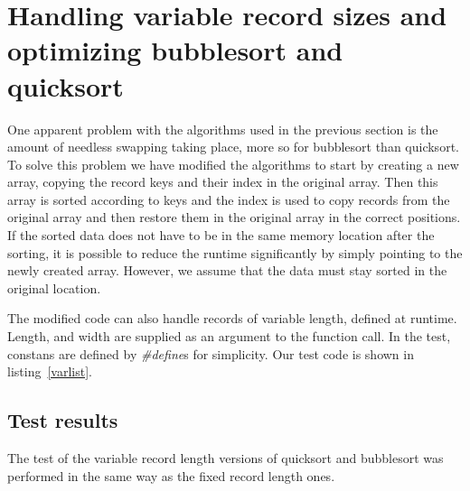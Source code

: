 \section{Handling variable record sizes and optimizing bubblesort and quicksort}
One apparent problem with the algorithms used in the previous section is the amount of needless swapping taking place, more so
for bubblesort than quicksort. To solve this problem we have modified the algorithms to start by creating a new array, copying 
the record keys and their index in the original array. Then this array is sorted according to keys and the index is used to copy 
records from the original array and then restore them in the original array in the correct positions. If the sorted data does not have
to be in the same memory location after the sorting, it is possible to reduce the runtime significantly by simply pointing to the newly
created array. However, we assume that the data must stay sorted in the original location.

The modified code can also handle records of variable length, defined at
runtime. Length, and width are supplied as an argument to the function call. In the test, constans are defined
by \emph{\#define}s for
simplicity.
Our test code is shown in listing~\ref{varlist}. 
\subsection{Test results}
The test of the variable record length versions of quicksort and bubblesort was performed in the same way as the fixed record length ones.

